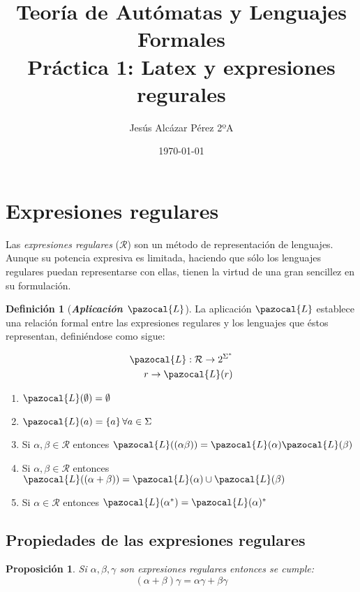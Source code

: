 \documentclass[fleqn, 10pt]{article}
\title{Teoría de Autómatas y Lenguajes Formales\\[.4\baselineskip]Práctica 1: Latex y expresiones regurales}
\author{Jesús Alcázar Pérez 2ºA}
\date{\today}
\newcommand{\Lb}{\pazocal{L}}
\theoremstyle{plain}
\newtheorem{proposicion}{Proposición}
\theoremstyle{definition}
\newtheorem{definition}{Definición}[section]
\begin{document}
\maketitle

\section{Expresiones regulares}

Las \textit{expresiones regulares} ($\mathcal{R}$) son un método de representación de
lenguajes. Aunque su potencia expresiva es limitada, haciendo que sólo los
lenguajes regulares puedan representarse con ellas, tienen la virtud de una gran
sencillez en su formulación.


\begin{definition}[\textbf{\textit{Aplicación $\Lb$}}]\label{def:aplicL}
	La aplicación $\Lb$ establece una relación formal entre las expresiones regulares y los lenguajes que éstos representan, definiéndose como sigue:
  \begin{ceqn}	%
    \begin{align*} %
    \Lb: \mathcal{R} \rightarrow 2^{\Sigma^*}\\ 
    r \rightarrow \Lb(r)
    \end{align*} 
  \end{ceqn} 
  
\begin{enumerate}[label=\alph{enumi})]
  \item $\Lb(\emptyset)=\emptyset$ 
  \item $\Lb(a)=\{a\} \, \forall a\in\Sigma$ 
  \item Si $\alpha,\beta \in \mathcal{R}$ entonces $\Lb((\alpha\beta))=\Lb(\alpha)\Lb(\beta)$
  \item Si $\alpha,\beta \in \mathcal{R}$ entonces $\Lb((\alpha+\beta))=\Lb(\alpha)\cup \Lb(\beta)$
  \item Si $\alpha \in \mathcal{R}$ entonces $\Lb(\alpha^*)=\Lb(\alpha)^*$
\end{enumerate}

\end{definition}

\subsection{Propiedades de las expresiones regulares}
\begin{proposicion}
Si $\alpha,\beta,\gamma$ son expresiones regulares entonces se cumple:
  \begin{equation}
  (\alpha+\beta)\gamma=\alpha\gamma+\beta\gamma
  \end{equation}
\end{proposicion}
\end{document}
